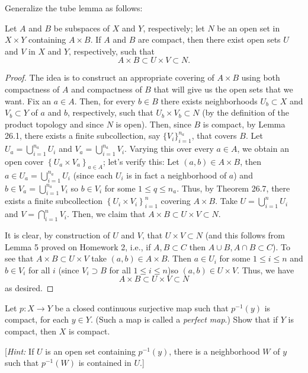 \newpage
\begin{problem}[Munkres \S26, Ex.\,9]
Generalize the tube lemma as follows:
\begin{theorem*}
Let $A$ and $B$ be subspaces of $X$ and $Y$, respectively; let
$N$ be an open set in $X\times Y$ containing $A\times B$. If $A$
and $B$ are compact, then there exist open sets $U$ and $V$ in
$X$ and $Y$, respectively, such that
\[A\times B\subset U\times V\subset N.\]
\end{theorem*}
\end{problem}
\begin{proof}
The idea is to construct an appropriate covering of $A\times B$ using
both compactness of $A$ and compactness of $B$ that will give us the
open sets that we want. Fix an $a\in A$. Then, for every $b\in B$
there exists neighborhoods $U_b\subset X$ and $V_b\subset Y$ of $a$
and $b$, respectively, such that $U_b\times V_b\subset N$ (by the
definition of the product topology and since $N$ is open). Then, since
$B$ is compact, by Lemma 26.1, there exists a finite subcollection,
say $\{V_i\}_{i=1}^{n_a}$, that covers $B$. Let $U_a=\bigcup_{i=1}^{n_a} U_i$
and $V_a=\bigcup_{i=1}^{n_a} V_i$. Varying this over every $a\in A$,
we obtain an open cover $\left\{U_a\times V_a\right\}_{a\in A}$; let's
verify this: Let $(a,b)\in A\times B$, then $a\in
U_a=\bigcup_{i=1}^{n_a}U_i$ (since each $U_i$ is in fact a
neighborhood of $a$) and $b\in V_a=\bigcup_{i=1}^{n_a}V_i$ so $b\in
V_i$ for some $1\leq q\leq n_a$. Thus, by Theorem 26.7, there exists a
finite subcollection $\left\{ U_i\times V_i \right\}_{i=1}^n$ covering
$A\times B$. Take $U=\bigcup_{i=1}^n U_i$ and $V=\bigcap_{i=1}^n
V_i$. Then, we claim that $A\times B\subset U\times V\subset N$.

It is clear, by construction of $U$ and $V$, that $U\times V\subset N$
(and this follows from Lemma 5 proved on Homework 2, i.e.,
if $A,B\subset C$ then $A\cup B,A\cap B\subset C$). To see that
$A\times B\subset U\times V$ take $(a,b)\in A\times B$. Then $a\in
U_i$ for some $1\leq i\leq n$ and $b\in V_i$ for all $i$ (since
$V_i\supset B$ for all $1\leq i\leq n$)so $(a,b)\in U\times V$. Thus,
we have
\[A\times B\subset U\times V\subset N\]
as desired.
\end{proof}
\newpage
\begin{problem}[Munkres \S26, Ex.\,12]
Let $p\colon X\to Y$ be a closed continuous surjective map
such that $p^{-1}(y)$ is compact, for each $y\in Y$. (Such a
map is called a \emph{perfect map}.) Show that if $Y$ is compact,
then $X$ is compact.

[\emph{Hint:} If $U$ is an open set containing $p^{-1}(y)$, there
is a neighborhood $W$ of $y$ such that $p^{-1}(W)$ is contained
in $U$.]
\end{problem}
